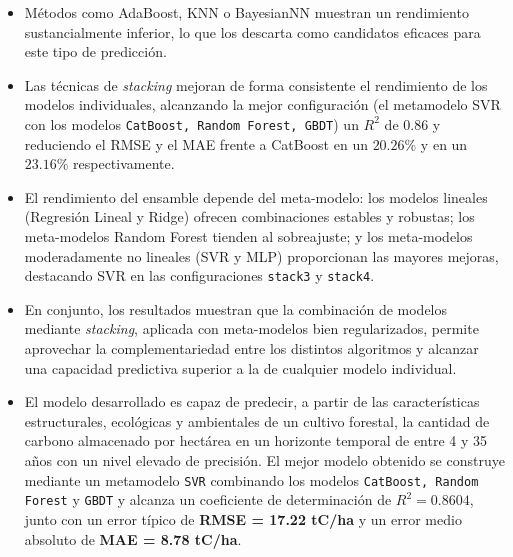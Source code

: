 \begin{itemize}
    \item Métodos como AdaBoost, KNN o BayesianNN muestran un rendimiento sustancialmente inferior,
          lo que los descarta como candidatos eficaces para este tipo de predicción.

    \item Las técnicas de \textit{stacking} mejoran de forma consistente el rendimiento de los
          modelos individuales, alcanzando la mejor configuración (el metamodelo SVR con los modelos
          \texttt{CatBoost, Random Forest, GBDT}) un $R^2$ de 0.86 y reduciendo el RMSE y el MAE
          frente a CatBoost en un $20.26\%$ y en un $23.16\%$ respectivamente.

    \item El rendimiento del ensamble depende del meta-modelo: los modelos lineales
          (Regresión Lineal y Ridge) ofrecen combinaciones estables y robustas; los meta-modelos Random
          Forest tienden al sobreajuste; y los meta-modelos moderadamente no lineales (SVR y MLP)
          proporcionan las mayores mejoras, destacando SVR en las configuraciones \texttt{stack3} y
          \texttt{stack4}.

    \item En conjunto, los resultados muestran que la combinación de modelos mediante
          \textit{stacking}, aplicada con meta-modelos bien regularizados, permite aprovechar la
          complementariedad entre los distintos algoritmos y alcanzar una capacidad predictiva superior
          a la de cualquier modelo individual.

    \item El modelo desarrollado es capaz de predecir, a partir de las características estructurales,
          ecológicas y ambientales de un cultivo forestal, la cantidad de carbono almacenado por hectárea
          en un horizonte temporal de entre 4 y 35 años con un nivel elevado de precisión.
          El mejor modelo obtenido se construye mediante un metamodelo \texttt{SVR} combinando los modelos
          \texttt{CatBoost, Random Forest} y \texttt{GBDT} y alcanza un coeficiente de determinación de
          \textbf{$R^2 = 0.8604$}, junto con un error típico de \textbf{RMSE = 17.22 tC/ha} y un error
          medio absoluto de \textbf{MAE = 8.78 tC/ha}.
\end{itemize}
